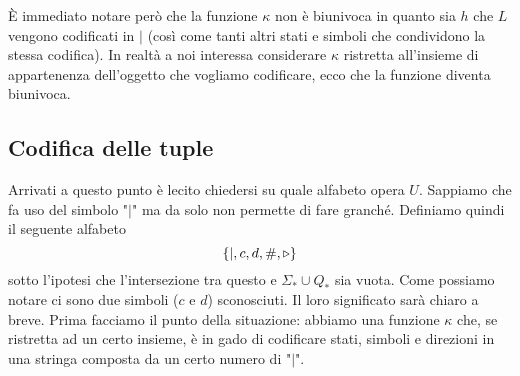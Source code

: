\`E immediato notare però che la funzione $\kappa$ non è
biunivoca in quanto sia $h$ che $L$ vengono codificati in $\mid$
(così come tanti altri stati e simboli che condividono la stessa
codifica). In realtà a noi interessa considerare $\kappa$
ristretta all'insieme di appartenenza dell'oggetto che vogliamo
codificare, ecco che la funzione diventa biunivoca.

\subsection{Codifica delle tuple}
Arrivati a questo punto è lecito chiedersi su quale alfabeto
opera $U$. Sappiamo che fa uso del simbolo "$\mid$" ma da solo
non permette di fare granché. Definiamo quindi il seguente
alfabeto
\[ \{ \mid, c, d, \#, \triangleright \} \]
sotto l'ipotesi che l'intersezione tra questo e
$\Sigma_* \cup Q_*$ sia vuota. Come possiamo notare ci sono due
simboli ($c$ e $d$) sconosciuti. Il loro significato sarà chiaro
a breve. Prima facciamo il punto della situazione: abbiamo una
funzione $\kappa$ che, se ristretta ad un certo insieme, è in
gado di codificare stati, simboli e direzioni in una stringa
composta da un certo numero di "$\mid$".

